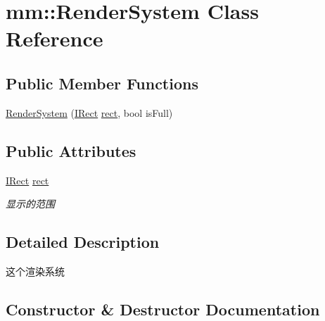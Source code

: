 \hypertarget{classmm_1_1_render_system}{}\section{mm\+:\+:Render\+System Class Reference}
\label{classmm_1_1_render_system}
\subsection*{Public Member Functions}
\begin{DoxyCompactItemize}
\item 
\hyperlink{classmm_1_1_render_system_a1d3eb7a3a648466a847bcf3565a133ed}{Render\+System} (\hyperlink{classmm_1_1_i_rect}{I\+Rect} \hyperlink{classmm_1_1_render_system_aa140a91c42041d40575e023bad2f40c9}{rect}, bool is\+Full)
\end{DoxyCompactItemize}
\subsection*{Public Attributes}
\begin{DoxyCompactItemize}
\item 
\hypertarget{classmm_1_1_render_system_aa140a91c42041d40575e023bad2f40c9}{}\hyperlink{classmm_1_1_i_rect}{I\+Rect} \hyperlink{classmm_1_1_render_system_aa140a91c42041d40575e023bad2f40c9}{rect}\label{classmm_1_1_render_system_aa140a91c42041d40575e023bad2f40c9}

\begin{DoxyCompactList}\small\item\em 显示的范围 \end{DoxyCompactList}\end{DoxyCompactItemize}


\subsection{Detailed Description}
这个渲染系统 

\subsection{Constructor \& Destructor Documentation}
\hypertarget{classmm_1_1_render_system_a1d3eb7a3a648466a847bcf3565a133ed}{}
